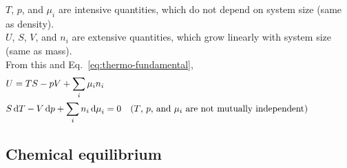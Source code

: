 \documentclass[11pt,a4paper,twoside]{article}
\numberwithin{equation}{section}
\newcommand{\eqn}[1]{Eq.~\eqref{#1}}
\begin{document}
$T$, $p$, and $\mu_{i}$ are intensive quantities, which do not depend on system size (same as density).\\[1ex]
$U$, $S$, $V$, and $n_{i}$ are extensive quantities, which grow linearly with system size (same as mass).\\[1ex]
From this and \eqn{eq:thermo-fundamental},
\begin{align}
    & U = T S - p V + \sum_{i} \mu_{i} n_{i} \\
    & S \dd{T} - V \dd{p} + \sum_{i} n_{i} \dd{\mu}_{i} = 0 
    & & \text{($T$, $p$, and $\mu_i$ are not mutually independent)
    \hspace*{0.1\columnwidth}} \label{eq:gibbs-duhem}
\end{align}

\subsection{Chemical equilibrium}
\end{document}
